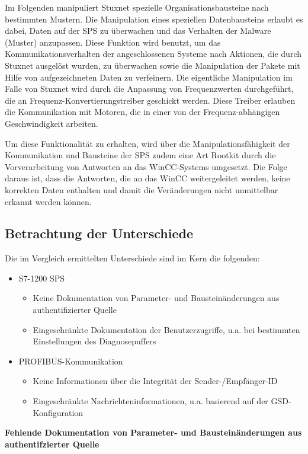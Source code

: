 Im Folgenden manipuliert Stuxnet spezielle Organisationsbausteine nach bestimmten Mustern. Die Manipulation eines speziellen Datenbausteins erlaubt es dabei, Daten auf der SPS zu überwachen und das Verhalten der Malware (Muster) anzupassen. Diese Funktion wird benutzt, um das Kommunikationsverhalten der angeschlossenen Systeme nach Aktionen, die durch Stuxnet ausgelöst wurden, zu überwachen sowie die Manipulation der Pakete mit Hilfe von aufgezeichneten Daten zu verfeinern. Die eigentliche Manipulation im Falle von Stuxnet wird durch die Anpassung von Frequenzwerten durchgeführt, die an Frequenz-Konvertierungstreiber geschickt werden. Diese Treiber erlauben die Kommunikation mit Motoren, die in einer von der Frequenz-abhängigen Geschwindigkeit arbeiten. 

Um diese Funktionalität zu erhalten, wird über die Manipulationsfähigkeit der Kommunikation und Bausteine der SPS zudem eine Art Rootkit durch die Vorverarbeitung von Antworten an das WinCC-Systems umgesetzt. Die Folge daraus ist, dass die Antworten, die an das WinCC weitergeleitet werden, keine korrekten Daten enthalten und damit die Veränderungen nicht unmittelbar erkannt werden können.

\subsection{Betrachtung der Unterschiede}
Die im Vergleich ermittelten Unterschiede sind im Kern die folgenden:
\begin{itemize}
\item S7-1200 SPS
\begin{itemize}
\item Keine Dokumentation von Parameter- und Bausteinänderungen aus authentifizierter Quelle
\item Eingeschränkte Dokumentation der Benutzerzugriffe, u.a. bei bestimmten Einstellungen des Diagnosepuffers
\end{itemize}
\item PROFIBUS-Kommunikation
\begin{itemize}
\item Keine Informationen über die Integrität der Sender-/Empfänger-ID
\item Eingeschränkte Nachrichteninformationen, u.a. basierend auf der GSD-Konfiguration
\end{itemize}
\end{itemize}

\textbf{Fehlende Dokumentation von Parameter- und Bausteinänderungen aus authentifzierter Quelle}

